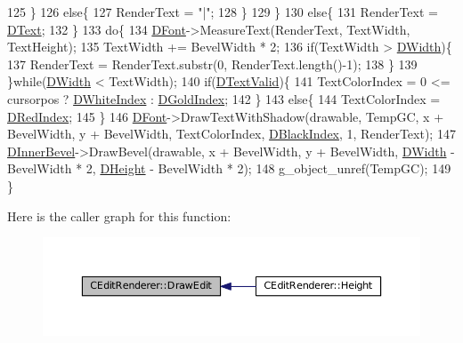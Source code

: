 \begin{DoxyCode}
125         \}
126         \textcolor{keywordflow}{else}\{
127             RenderText = \textcolor{stringliteral}{"|"};   
128         \}
129     \}
130     \textcolor{keywordflow}{else}\{
131         RenderText = \hyperlink{classCEditRenderer_af79bf047383c610d4fc24d937e29c594}{DText};
132     \}
133     \textcolor{keywordflow}{do}\{
134         \hyperlink{classCEditRenderer_afd108ae6cb3e9eeffce881a1ada0f0db}{DFont}->MeasureText(RenderText, TextWidth, TextHeight); 
135         TextWidth += BevelWidth * 2;
136         \textcolor{keywordflow}{if}(TextWidth > \hyperlink{classCEditRenderer_ab203e5083f61d3575eb491f170c21d45}{DWidth})\{
137             RenderText = RenderText.substr(0, RenderText.length()-1);
138         \}
139     \}\textcolor{keywordflow}{while}(\hyperlink{classCEditRenderer_ab203e5083f61d3575eb491f170c21d45}{DWidth} < TextWidth);
140     \textcolor{keywordflow}{if}(\hyperlink{classCEditRenderer_ab4f0c6b356170adad1ad3b3e16573966}{DTextValid})\{
141         TextColorIndex = 0 <= cursorpos ? \hyperlink{classCEditRenderer_aaa97fde55438f6ad02cbb365097a2274}{DWhiteIndex} : \hyperlink{classCEditRenderer_adef6e0cd1cc67b18a196bbac95a7306b}{DGoldIndex};
142     \}
143     \textcolor{keywordflow}{else}\{
144         TextColorIndex = \hyperlink{classCEditRenderer_a77ce4df48e03a8b9245f2045c2c3c4e7}{DRedIndex};   
145     \}
146     \hyperlink{classCEditRenderer_afd108ae6cb3e9eeffce881a1ada0f0db}{DFont}->DrawTextWithShadow(drawable, TempGC, x + BevelWidth, y + BevelWidth, TextColorIndex, 
      \hyperlink{classCEditRenderer_a13b03f02ff6673d8df2d6509c17bcccc}{DBlackIndex}, 1, RenderText);
147     \hyperlink{classCEditRenderer_a45b1bf4e9aebe3811c15df1018b8d8da}{DInnerBevel}->DrawBevel(drawable, x + BevelWidth, y + BevelWidth, 
      \hyperlink{classCEditRenderer_ab203e5083f61d3575eb491f170c21d45}{DWidth} - BevelWidth * 2, \hyperlink{classCEditRenderer_ade8dedb4f9790d28b38da8ef20a171cb}{DHeight} - BevelWidth * 2);
148     g\_object\_unref(TempGC);
149 \}
\end{DoxyCode}
Here is the caller graph for this function\+:
\nopagebreak
\begin{figure}[H]
\begin{center}
\leavevmode
\includegraphics[width=350pt]{classCEditRenderer_a3b043cca5f931cdbbfff35d07100be5e_icgraph}
\end{center}
\end{figure}
\hypertarget{classCEditRenderer_ad5ad32a8ae2372e21bb9365a6b6d0f59}{}\label{classCEditRenderer_ad5ad32a8ae2372e21bb9365a6b6d0f59} 

